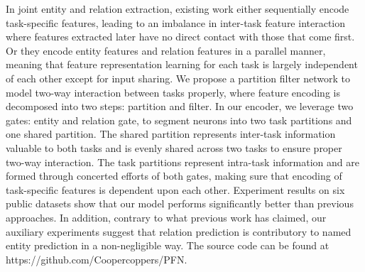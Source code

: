 In joint entity and relation extraction, existing work either sequentially encode task-specific features, leading to an imbalance in inter-task feature interaction where features extracted later have no direct contact with those that come first. Or they encode entity features and relation features in a parallel manner, meaning that feature representation learning for each task is largely independent of each other except for input sharing. We propose a partition filter network to model two-way interaction between tasks properly, where feature encoding is decomposed into two steps: partition and filter. In our encoder, we leverage two gates: entity and relation gate, to segment neurons into two task partitions and one shared partition. The shared partition represents inter-task information valuable to both tasks and is evenly shared across two tasks to ensure proper two-way interaction. The task partitions represent intra-task information and are formed through concerted efforts of both gates, making sure that encoding of task-specific features is dependent upon each other. Experiment results on six public datasets show that our model performs significantly better than previous approaches. In addition, contrary to what previous work has claimed, our auxiliary experiments suggest that relation prediction is contributory to named entity prediction in a non-negligible way.  The source code can be found at https://github.com/Coopercoppers/PFN.
